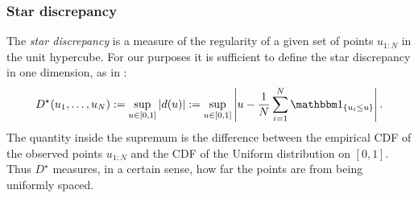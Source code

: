 \subsubsection{Star discrepancy}
The \emph{star discrepancy} is a measure of the regularity of a given set of points $u_{1:N}$ in the unit hypercube. For our purposes it is sufficient to define the star discrepancy in one dimension, as in \textcite[Definition 1.2]{kuipers1974}:
\begin{equation}\label{eq:defn_stardiscrepancy}
D^\star (u_1, \dots, u_N)
:= \sup_{u \in [0,1]} | d(u) |
:= \sup_{u \in [0,1]} \left| u - \frac{1}{N} \sum_{i=1}^N \I{u_i \leq u} \right| .
\end{equation}
The quantity inside the supremum is the difference between the empirical CDF of the observed points $u_{1:N}$ and the CDF of the Uniform distribution on $[0,1]$.
Thus $D^\star$ measures, in a certain sense, how far the points are from being uniformly spaced.

